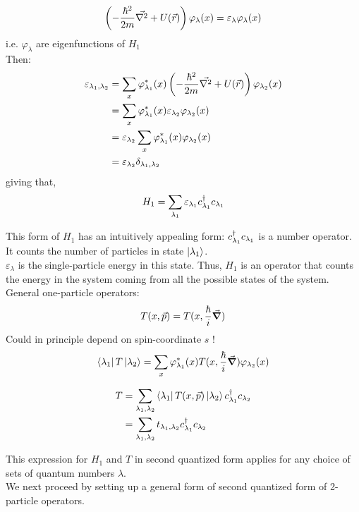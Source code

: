 \begin{equation}
	\left(-\frac{\hbar^2}{2m} \vec{\laplacian}+ U(\vec{r})  \right) \varphi_\lambda(x) = \varepsilon_\lambda \varphi_\lambda(x)
\end{equation}
i.e. ${\varphi_\lambda}$ are eigenfunctions of $H_1$\\
\linebreak
\noindent Then:
\begin{align}
	\varepsilon_{\lambda_1, \lambda_2} &= \sum_x \varphi_{\lambda_1}^*(x)  \left(-\frac{\hbar^2}{2m} \vec{\laplacian}+ U(\vec{r})  \right) \varphi_{\lambda_2} (x)\\
	&=  \sum_x \varphi_{\lambda_1}^*(x) \varepsilon_{\lambda_2} \varphi_{\lambda_2}(x) \nonumber \\
	&= \varepsilon_{\lambda_2} \sum_x \varphi_{\lambda_1}^*(x) \varphi_{\lambda_2}(x)\nonumber \\
	&= \varepsilon_{\lambda_2} \delta_{\lambda_1, \lambda_2} \nonumber
\end{align}
giving that, 
\begin{equation}
	H_1 = \sum_{\lambda_1} \varepsilon_{\lambda_1} c^{\dagger}_{\lambda_1} c_{\lambda_1}
\end{equation}

\noindent This form of $H_1$ has an intuitively appealing form: $  c^{\dagger}_{\lambda_1} c_{\lambda_1}$ is a number operator. It counts the number of particles in state $\ket{\lambda_1}$.\\
\noindent $\varepsilon_\lambda$ is the single-particle energy in this state. Thus, $H_1$ is an operator that counts the energy in the system coming from all the possible states of the system.\\
\linebreak
\noindent General one-particle operators:
\begin{equation}
	T(x, \vec{p}) = T(x, \frac{\hbar}{i} \vec{\gradient}) 
\end{equation}
Could in principle depend on spin-coordinate $s$ !
\begin{equation}
	\bra{\lambda_1} T \ket{\lambda_2} = \sum_x \varphi_{\lambda_1}^*(x) T(x, \frac{\hbar}{i} \vec{\gradient}) \varphi_{\lambda_2}(x)
\end{equation}

\begin{tcolorbox}
	\begin{align}
		T &= \sum_{\lambda_1,\lambda_2} \bra{\lambda_1} T(x, \vec{p}) \ket{\lambda_2} c^{\dagger}_{\lambda_1} c_{\lambda_2}\\
		&=\sum_{\lambda_1,\lambda_2} t_{\lambda_1,\lambda_2} c^{\dagger}_{\lambda_1} c_{\lambda_2} \nonumber
	\end{align}
\end{tcolorbox}
\noindent This expression for $H_1$ and $T$ in second quantized form applies for any choice of sets of quantum numbers $\lambda$.\\
\linebreak
\noindent We next proceed by setting up a general form of second quantized form of 2-particle operators.





